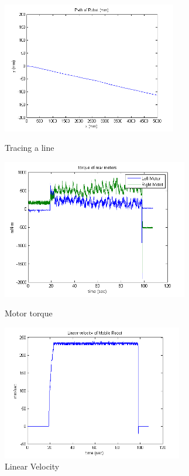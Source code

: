 \begin{figure}
	\begin{minipage}[t]{0.5\textwidth}
		\centering
		\includegraphics[width=3.0in]{Chapter5/fig/line} 
		\caption{Tracing a line}\label{fig:line}
	\end{minipage}
	\hfill
	\begin{minipage}[t]{0.5\textwidth}
		\centering
		\includegraphics[width=3.2in]{Chapter5/fig/linTorq} 
		\caption{Motor torque}\label{fig:linTorq}
	\end{minipage}
	\begin{minipage}[t]{0.5\textwidth}
		\centering
		\includegraphics[width=3.1in]{Chapter5/fig/linVel} 
		\caption{Linear Velocity}\label{fig:linVel}
	\end{minipage}
	\hfill
	\begin{minipage}[t]{0.5\textwidth}

\end{minipage}
\end{figure}
